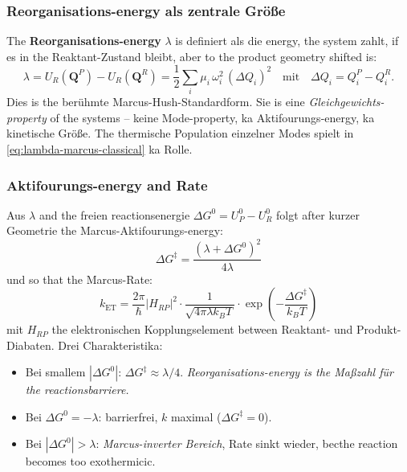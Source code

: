 \documentclass[11pt,a4paper,twoside]{article}
\theoremstyle{remark}
\begin{document}
\subsubsection*{Reorganisations-energy als zentrale Gr\"o{\ss}e}

The \textbf{Reorganisations-energy} $\lambda$ is definiert als die
energy, the system zahlt, if es in the Reaktant-Zustand bleibt,
aber to the product geometry shifted is:
\begin{equation}
  \lambda = U_R(\mathbf{Q}^P) - U_R(\mathbf{Q}^R)
          = \frac{1}{2}\sum_i \mu_i\,\omega_i^2\,(\Delta Q_i)^2
  \quad\text{mit}\quad \Delta Q_i = Q_i^P - Q_i^R.
  \label{eq:lambda-marcus-classical}
\end{equation}
Dies is the ber\"uhmte Marcus-Hush-Standardform. Sie is eine
\emph{Gleichgewichts-property} of the systems -- keine
Mode-property, ka Aktifourungs-energy, ka kinetische
Gr\"o{\ss}e. The thermische Population einzelner Modes spielt in
\eqref{eq:lambda-marcus-classical} ka Rolle.

\subsubsection*{Aktifourungs-energy and Rate}

Aus $\lambda$ and the freien reactionsenergie $\Delta G^0 = U_P^0 -
U_R^0$ folgt after kurzer Geometrie the Marcus-Aktifourungs-energy:
\begin{equation}
  \Delta G^\ddagger = \frac{(\lambda + \Delta G^0)^2}{4\lambda}
\end{equation}
und so that the Marcus-Rate:
\begin{equation}
  k_\text{ET} = \frac{2\pi}{\hbar}|H_{RP}|^2 \cdot
                \frac{1}{\sqrt{4\pi\lambda k_BT}} \cdot
                \exp\!\left(-\frac{\Delta G^\ddagger}{k_BT}\right)
  \label{eq:marcus-rate}
\end{equation}
mit $H_{RP}$ the elektronischen Kopplungselement between Reaktant-
und Produkt-Diabaten. Drei Charakteristika:

\begin{itemize}\setlength{\itemsep}{0pt}
  \item Bei smallem $|\Delta G^0|$: $\Delta G^\ddagger \approx
        \lambda/4$. \emph{Reorganisations-energy is the Ma{\ss}zahl
        f\"ur the reactionsbarriere.}
  \item Bei $\Delta G^0 = -\lambda$: barrierfrei, $k$ maximal
        ($\Delta G^\ddagger = 0$).
  \item Bei $|\Delta G^0| > \lambda$: \emph{Marcus-inverter Bereich},
        Rate sinkt wieder, becthe reaction becomes too exothermicic.
\end{itemize}
\end{document}
